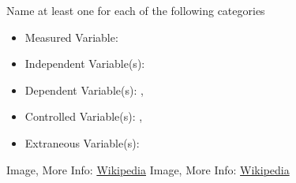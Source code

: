 \documentclass[fleqn]{beamer} %
\begin{document}
\begin{frame}[label=sectionV]
\begin{multicols}{2}
		    Name at least one for each of the following categories 
	
			\begin{itemize}
				\item Measured Variable: \hspcu \vspc 
				\item Independent Variable(s): \hspcu \vspc
				\item Dependent Variable(s): \hspcu, \hspcu \vspc 
				\item Controlled Variable(s): \hspcu, \hspcu \vspc 
				\item Extraneous Variable(s):\hspcu \vspc
			\end{itemize}
			
			\end{multicols}	

			{\tiny Image, More Info: \href{https://en.wikipedia.org/wiki/Proximity_sensor}{Wikipedia} }\hspace{40mm} {\tiny Image, More Info: \href{https://en.wikipedia.org/wiki/Position_sensitive_device}{Wikipedia} }

	\end{frame}
\end{document}
